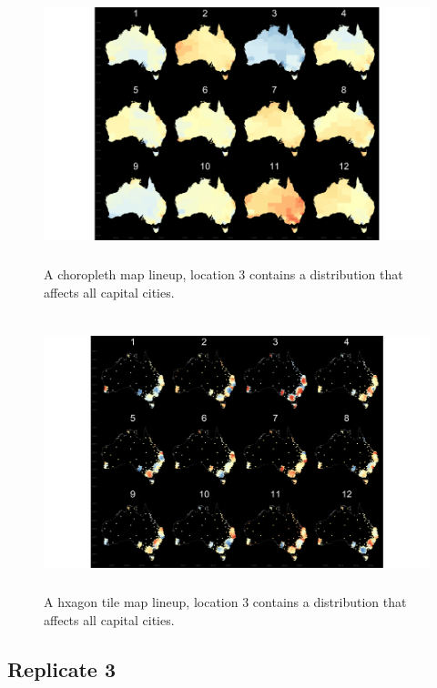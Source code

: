 \documentclass{monashthesis}
\begin{document}
\begin{figure}[H]
\centering
\includegraphics[height=8cm]{lineups/cities-geo3-1.pdf}
\caption{\label{fig:cities-geo3}A choropleth map lineup, location 3 contains a distribution that affects all capital cities.}
\end{figure}

\begin{figure}[H]
\centering
\includegraphics[height=8cm]{lineups/cities-hex3-1.pdf}
\caption{\label{fig:cities-hex3}A hxagon tile map lineup, location 3 contains a distribution that affects all capital cities.}
\end{figure}

\hypertarget{replicate-3}{%
\subsection{Replicate 3}\label{replicate-3}}
\end{document}
